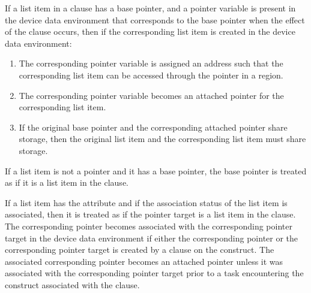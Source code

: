 \begin{ccppspecific}
If a list item in a  clause has a base pointer, and a pointer
variable is present in the device data environment that corresponds to the
base pointer when the effect of the  clause occurs, then if the corresponding
list item is created in the device data environment: 

\begin{enumerate}

\item The corresponding pointer variable is assigned an address such that the
corresponding list item can be accessed through the pointer in a
 region.

\item The corresponding pointer variable becomes an attached pointer
for the corresponding list item.

\item If the original base pointer and the corresponding attached pointer
share storage, then the original list item and the corresponding list item 
must share storage. 

\end{enumerate}

\end{ccppspecific}

\begin{fortranspecific}
If a list item is not a pointer and it has a base pointer, the base
pointer is treated as if it is a list item in the clause.

If a list item has the  attribute and if the association
status of the list item is associated, then it is treated as if the
pointer target is a list item in the clause.
The corresponding pointer becomes associated with the corresponding
pointer target in the device data environment if either the
corresponding pointer or the corresponding pointer target is created
by a  clause on the construct.  The associated corresponding
pointer becomes an attached pointer unless it was associated with the
corresponding pointer target prior to a task encountering the
construct associated with the  clause.

\end{fortranspecific}

